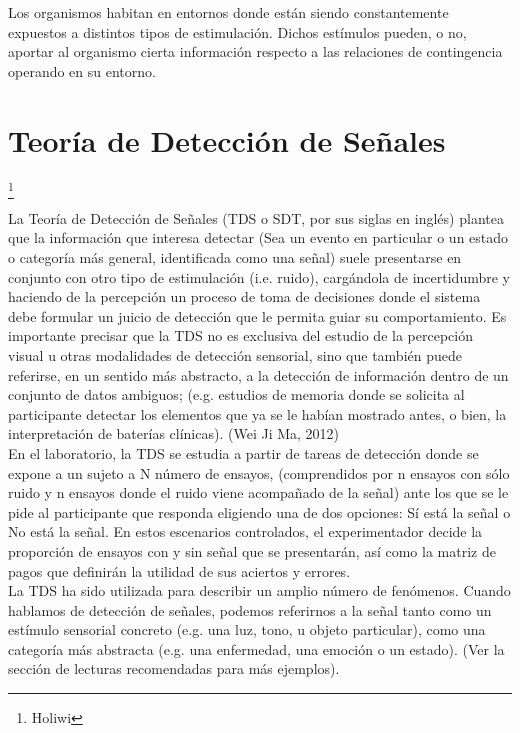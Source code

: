 Los organismos habitan en entornos donde están siendo constantemente expuestos a distintos tipos de estimulación. Dichos estímulos pueden, o no, aportar al organismo cierta información respecto a las relaciones de contingencia operando en su entorno. 





\section{Teoría de Detección de Señales}\footnote{Holiwi}

La Teoría de Detección de Señales (TDS o SDT, por sus siglas en inglés) plantea que la información que  interesa  detectar  (Sea un evento en particular o un estado o categoría más general, identificada como una señal)  suele  presentarse  en  conjunto  con  otro  tipo  de  estimulación (i.e. ruido),  cargándola  de  incertidumbre  y  haciendo de  la  percepción  un  proceso  de  toma  de decisiones  donde  el  sistema  debe  formular  un  juicio  de  detección que  le  permita  guiar  su comportamiento. Es importante precisar  que la TDS no es exclusiva del estudio de la percepción visual  u  otras  modalidades  de  detección  sensorial,  sino  que  también  puede  referirse,  en  un sentido más abstracto, a la detección de información dentro de un conjunto de datos ambiguos; (e.g.  estudios  de  memoria  donde  se  solicita  al  participante  detectar  los  elementos  que  ya  se  le habían mostrado antes, o bien, la interpretación de baterías clínicas). (Wei Ji Ma, 2012)\\

En el laboratorio, la  TDS se estudia a partir  de tareas de detección donde se expone a un  sujeto  a  N  número  de  ensayos,  (comprendidos  por  n  ensayos con  sólo  ruido  y  n  ensayos donde  el  ruido  viene  acompañado  de  la  señal)  ante  los  que  se  le  pide  al  participante  que responda eligiendo una de dos opciones: Sí está la señal o No está la señal. En estos escenarios controlados,  el  experimentador  decide  la  proporción  de  ensayos  con  y  sin  señal  que  se presentarán, así como la matriz de pagos que definirán la utilidad de sus aciertos y errores. \\

La TDS ha sido utilizada para describir un amplio número de fenómenos. Cuando hablamos de detección de señales, podemos referirnos a la señal tanto como un estímulo sensorial concreto (e.g. una luz, tono, u objeto particular), como una categoría más abstracta (e.g. una enfermedad, una emoción o un estado).  (Ver la sección de lecturas recomendadas para más ejemplos).\\


